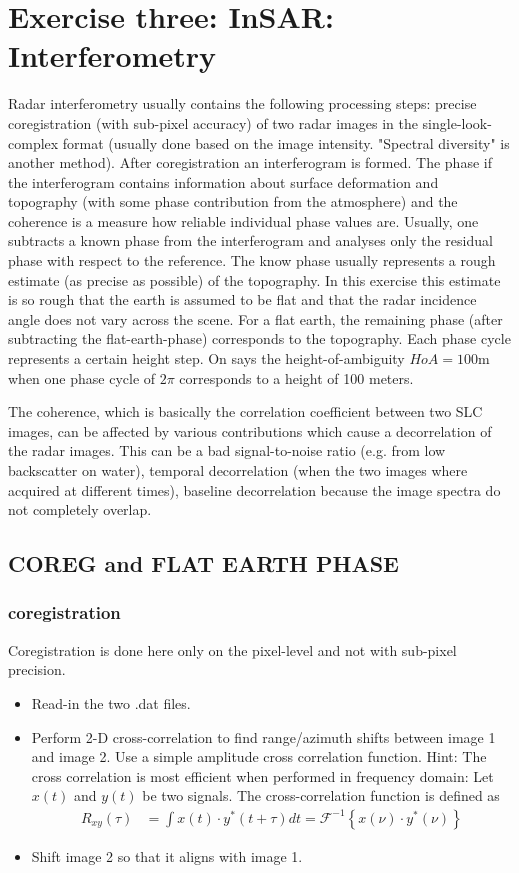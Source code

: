 \newpage
\section{Exercise three: InSAR: Interferometry}
Radar interferometry usually contains the following processing steps: precise coregistration (with sub-pixel accuracy) of two radar images in the single-look-complex format (usually done based on the image intensity. "{}Spectral diversity"{} is another method). After coregistration an interferogram is formed. The phase if the interferogram contains information about surface deformation and topography (with some phase contribution from the atmosphere) and the coherence is a measure how reliable individual phase values are. Usually, one subtracts a known phase from the interferogram and analyses only the residual phase with respect to the reference. The know phase usually represents a rough estimate (as precise as possible) of the topography. In this exercise this estimate is so rough that the earth is assumed to be flat and that the radar incidence angle does not vary across the scene. For a flat earth, the remaining phase (after subtracting the flat-earth-phase) corresponds to the topography. Each phase cycle represents a certain height step. On says the height-of-ambiguity $HoA = 100$m when one phase cycle of $2\pi$ corresponds to a height of 100 meters. 

The coherence, which is basically the correlation coefficient between two SLC images, can be affected by various contributions which cause a decorrelation of the radar images. This can be a bad signal-to-noise ratio (e.g. from low backscatter on water), temporal decorrelation (when the two images where acquired at different times), baseline decorrelation because the image spectra do not completely overlap.

\subsection{COREG and FLAT EARTH PHASE}
\subsubsection{coregistration}\label{coreg}
Coregistration is done here only on the pixel-level and not with sub-pixel precision.
\begin{itemize}
\item Read-in the two .dat files.
\item Perform 2-D cross-correlation to find range/azimuth shifts between image 1 and image 2. Use a simple amplitude cross correlation function. Hint: The cross correlation is most efficient when performed in frequency domain: Let $x(t)$ and $y(t)$ be two signals. The cross-correlation function is defined as
 \begin{align}
 R_{xy}(\tau) &= \int x(t)\cdot y^*(t+\tau)dt = \mathcal{F}^{-1}\left\{x(\nu)\cdot y^*(\nu)\right\}
 \end{align}
 \item Shift image 2 so that it aligns with image 1.
\end{itemize}
 
